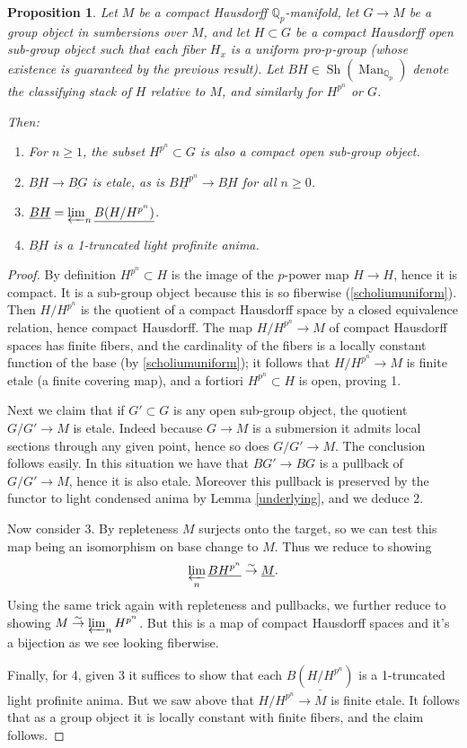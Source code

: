 \documentclass[12pt]{article}
\newtheorem{proposition}[theorem]{Proposition}
\newcommand{\on}{\operatorname}
\newcommand{\mbb}{\mathbb}
\newcommand{\ul}{\underline}
\begin{document}
\begin{proposition}\label{localstructurecorollary}
Let $M$ be a compact Hausdorff $\mathbb{Q}_p$-manifold, let $G\to M$ be a group object in sumbersions over $M$, and let $H\subset G$ be a compact Hausdorff open sub-group object such that each fiber $H_x$ is a uniform pro-$p$-group (whose existence is guaranteed by the previous result).  Let $BH \in \on{Sh}(\on{Man}_{\mbb{Q}_p})$ denote the classifying stack of $H$ relative to $M$, and similarly for $H^{p^n}$ or $G$.  

Then:
\begin{enumerate}
\item For $n\geq 1$, the subset $H^{p^n}\subset G$ is also a compact open sub-group object.
\item $\underline{BH}\to \underline{BG}$ is etale, as is $\underline{BH^{p^n}}\to \underline{BH}$ for all $n\geq 0$.
\item $\underline{BH} = \varprojlim_n \underline{B(H/H^{p^n})}$.
\item $\underline{BH}$ is a 1-truncated light profinite anima.
\end{enumerate}
\end{proposition}
\begin{proof}
By definition $H^{p^n}\subset H$ is the image of the $p$-power map $H \to H$, hence it is compact.  It is  a sub-group object because this is so fiberwise (\ref{scholiumuniform}).  Then $H/H^{p^n}$ is the quotient of a compact Hausdorff space by a closed equivalence relation, hence compact Hausdorff.  The map $H/H^{p^n}\to M$ of compact Hausdorff spaces has finite fibers, and the cardinality of the fibers is a locally constant function of the base (by \ref{scholiumuniform}); it follows that $H/H^{p^n}\to M$ is finite etale (a finite covering map), and a fortiori $H^{p^n}\subset H$ is open, proving 1.

Next we claim that if $G'\subset G$ is any open sub-group object, the quotient $G/G'\to M$ is etale.  Indeed because $G\to M$ is a submersion it admits local sections through any given point, hence so does $G/G'\to M$.  The conclusion follows easily.  In this situation we have that $BG'\to BG$ is a pullback of $G/G'\to M$, hence it is also etale.  Moreover this pullback is preserved by the functor to light condensed anima by Lemma \ref{underlying}, and we deduce 2.

Now consider 3.  By repleteness $M$ surjects onto the target, so we can test this map being an isomorphism on base change to $M$.  Thus we reduce to showing 
$$\varprojlim_n \ul{BH^{p^n}} \overset{\sim}{\rightarrow} \ul{M}.$$
Using the same trick again with repleteness and pullbacks, we further reduce to showing $M\overset{\sim}{\rightarrow}\varprojlim_n H^{p^n}$.  But this is a map of compact Hausdorff spaces and it's a bijection as we see looking fiberwise.

Finally, for 4, given 3 it suffices to show that each $\ul{B(H/H^{p^n})}$ is a 1-truncated light profinite anima.  But we saw above that $H/H^{p^n}\to M$ is finite etale.  It follows that as a group object it is locally constant with finite fibers, and the claim follows.
\end{proof}
\end{document}
